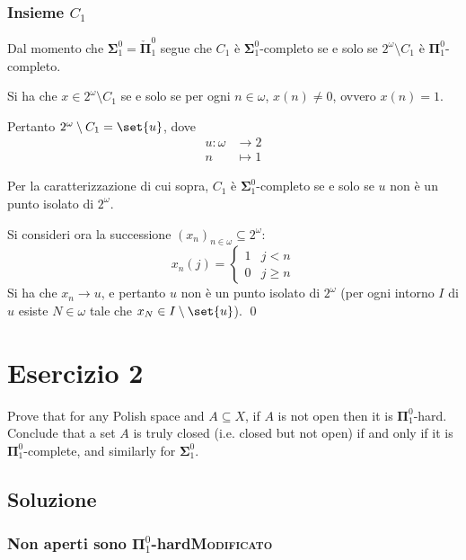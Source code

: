 \documentclass{article}
\newcommand{\1}{\mathds{1}}
\begin{document}
\subsubsection{Insieme \(C_{1}\)}
\label{sec:org7d4fb60}

Dal momento che \(\bm{\Sigma}_{1}^{0} = \check{\bm{\Pi}}_{1}^{0}\) segue che \(C_{1}\) è \(\bm{\Sigma}_{1}^{0}\)-completo se e solo se \(2^{\omega}\setminus C_1\) è \(\bm{\Pi}_{1}^{0}\)-completo.

Si ha che \(x \in 2^{\omega}\setminus C_{1}\) se e solo se per ogni \(n \in \omega\), \(x(n)\neq 0\), ovvero \(x(n)=1\).

Pertanto \(2^{\omega}\setminus C_{1} =  \set{u}\), dove
\begin{align*}
u: \omega &\longrightarrow 2\\
n &\longmapsto 1
\end{align*}

Per la caratterizzazione di cui sopra, \(C_{1}\) è \(\bm{\Sigma}_{1}^{0}\)-completo se e solo se \(u\) non è un punto isolato di \(2^{\omega}\).

Si consideri ora la successione \((x_{n})_{n \in \omega} \subseteq 2^{\omega}\):
\begin{equation*}
x_{n}(j) = \begin{cases}
1 & j<n\\
0 &j\ge n
\end{cases}
\end{equation*}
Si ha che \(x_{n}\to u\), e pertanto \(u\) non è un punto isolato di \(2^{\omega}\) (per ogni intorno \(I\) di \(u\) esiste \(N \in \omega\) tale che \(x_{N} \in I\setminus\set{u}\)). \qed
\section{Esercizio 2}
\label{sec:org8ad8b62}

Prove that for any Polish space and \(A \subseteq X\), if \(A\) is not open then it is \(\bm{\Pi}_{1}^{0}\)-hard. Conclude that a set \(A\) is truly closed (i.e. closed but not open) if and only if it is \(\bm{\Pi}_{1}^{0}\)-complete, and similarly for \(\bm{\Sigma}_{1}^{0}\).
\subsection{Soluzione}
\label{sec:orgac76c22}

\subsubsection{Non aperti sono \(\mathbf{\Pi}_{1}^{0}\)-hard\hfill{}\textsc{Modificato}}
\label{sec:org2319ee5}
\end{document}
